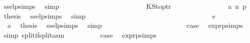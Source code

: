 \begin{isabellebody}
\ ssel{\isachardot}{\kern0pt}psimps{\isacharparenleft}{\kern0pt}{}{\isacharparenright}{\kern0pt}\ \isamarkupfalse%
\ simp\isanewline
\ \ \ \ \ \ \ \ \ \ \isamarkupfalse%
\isanewline
\ \ \ \ \ \ \ \ \ \ \ \ \isamarkupfalse%
\ {\isacharparenleft}{\kern0pt}KStoptr\ {\isacharunderscore}{\kern0pt}{\isacharparenright}{\kern0pt}\isanewline
\ \ \ \ \ \ \ \ \ \ \ \ \isamarkupfalse%
\ {}\ a{}\ n\ p{}\ \isamarkupfalse%
\ {\isacharquery}{\kern0pt}thesis\ \isamarkupfalse%
\ ssel{\isachardot}{\kern0pt}psimps{\isacharparenleft}{\kern0pt}{}{\isacharparenright}{\kern0pt}\ \isamarkupfalse%
\ simp\isanewline
\ \ \ \ \ \ \ \ \ \ \isamarkupfalse%
\isanewline
\ \ \ \ \ \ \ \ \isamarkupfalse%
\isanewline
\ \ \ \ \ \ \isamarkupfalse%
\isanewline
\ \ \ \ \ \ \ \ \isamarkupfalse%
\ {\isacharparenleft}{\kern0pt}e\ {\isacharunderscore}{\kern0pt}{\isacharparenright}{\kern0pt}\isanewline
\ \ \ \ \ \ \ \ \isamarkupfalse%
\ {}\ a{}\ \isamarkupfalse%
\ {\isacharquery}{\kern0pt}thesis\ \isamarkupfalse%
\ ssel{\isachardot}{\kern0pt}psimps{\isacharparenleft}{\kern0pt}{}{\isacharparenright}{\kern0pt}\ \isamarkupfalse%
\ simp\isanewline
\ \ \ \ \ \ \isamarkupfalse%
\isanewline
\ \ \ \ \isamarkupfalse%
\isanewline
\ \ \isamarkupfalse%
\isanewline
{}\isamarkupfalse%
\isanewline
\ \ \isamarkupfalse%
\ {}\isanewline
\ \ \isamarkupfalse%
\ \isamarkupfalse%
\ {\isacharquery}{\kern0pt}case\ \isamarkupfalse%
\ expr{\isachardot}{\kern0pt}psimps{\isacharparenleft}{\kern0pt}{}{\isacharparenright}{\kern0pt}\ \isamarkupfalse%
\ {\isacharparenleft}{\kern0pt}simp\ split{\isacharcolon}{\kern0pt}if{\isacharunderscore}{\kern0pt}split{\isacharunderscore}{\kern0pt}asm{\isacharparenright}{\kern0pt}\isanewline
{}\isamarkupfalse%
\isanewline
\ \ \isamarkupfalse%
\ {}{}\isanewline
\ \ \isamarkupfalse%
\ \isamarkupfalse%
\ {\isacharquery}{\kern0pt}case\ \isamarkupfalse%
\ expr{\isachardot}{\kern0pt}psimps{\isacharparenleft}{\kern0pt}{}{\isacharparenright}{\kern0pt}\ \isamarkupfalse%

\end{isabellebody}
